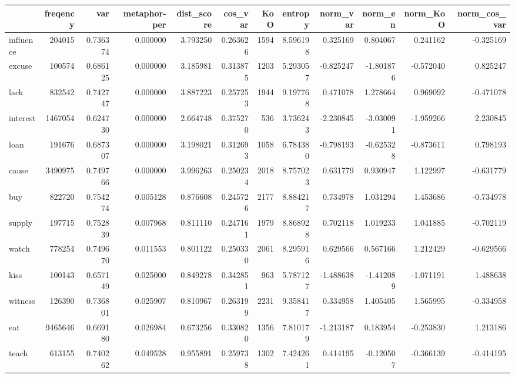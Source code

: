 \begin{tabular}{lrrrrrrrrrrr}
\toprule
{} &  freqency &       var &  metaphor-per &  dist\_score &   cos\_var &   KoO &   entropy &  norm\_var &   norm\_en &  norm\_KoO &  norm\_cos\_var \\
\midrule
influence &    204015 &  0.736374 &      0.000000 &    3.793250 &  0.263626 &  1594 &  8.596198 &  0.325169 &  0.804067 &  0.241162 &     -0.325169 \\
excuse    &    100574 &  0.686125 &      0.000000 &    3.185981 &  0.313875 &  1203 &  5.293057 & -0.825247 & -1.801876 & -0.572040 &      0.825247 \\
lack      &    832542 &  0.742747 &      0.000000 &    3.887223 &  0.257253 &  1944 &  9.197768 &  0.471078 &  1.278664 &  0.969092 &     -0.471078 \\
interest  &   1467054 &  0.624730 &      0.000000 &    2.664748 &  0.375270 &   536 &  3.736243 & -2.230845 & -3.030091 & -1.959266 &      2.230845 \\
loan      &    191676 &  0.687307 &      0.000000 &    3.198021 &  0.312693 &  1058 &  6.784380 & -0.798193 & -0.625328 & -0.873611 &      0.798193 \\
cause     &   3490975 &  0.749766 &      0.000000 &    3.996263 &  0.250234 &  2018 &  8.757023 &  0.631779 &  0.930947 &  1.122997 &     -0.631779 \\
buy       &    822720 &  0.754274 &      0.005128 &    0.876608 &  0.245726 &  2177 &  8.884217 &  0.734978 &  1.031294 &  1.453686 &     -0.734978 \\
supply    &    197715 &  0.752839 &      0.007968 &    0.811110 &  0.247161 &  1979 &  8.868928 &  0.702118 &  1.019233 &  1.041885 &     -0.702119 \\
watch     &    778254 &  0.749670 &      0.011553 &    0.801122 &  0.250330 &  2061 &  8.295916 &  0.629566 &  0.567166 &  1.212429 &     -0.629566 \\
kiss      &    100143 &  0.657149 &      0.025000 &    0.849278 &  0.342851 &   963 &  5.787127 & -1.488638 & -1.412089 & -1.071191 &      1.488638 \\
witness   &    126390 &  0.736801 &      0.025907 &    0.810967 &  0.263199 &  2231 &  9.358417 &  0.334958 &  1.405405 &  1.565995 &     -0.334958 \\
eat       &   9465646 &  0.669180 &      0.026984 &    0.673256 &  0.330820 &  1356 &  7.810179 & -1.213187 &  0.183954 & -0.253830 &      1.213186 \\
teach     &    613155 &  0.740262 &      0.049528 &    0.955891 &  0.259738 &  1302 &  7.424261 &  0.414195 & -0.120507 & -0.366139 &     -0.414195 \\

\end{tabular}
